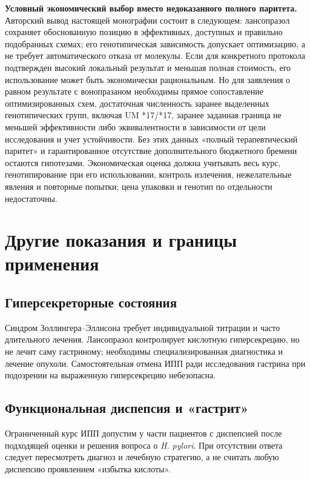 \documentclass[11pt,a4paper,notitlepage]{report}
\newcommand{\Hp}{\textit{H. pylori}}
\newcommand{\src}[1]{\unskip\space\cite{#1}}
\begin{document}
\textbf{Условный экономический выбор вместо недоказанного полного паритета.} Авторский вывод настоящей монографии состоит в следующем: лансопразол сохраняет обоснованную позицию в эффективных, доступных и правильно подобранных схемах; его генотипическая зависимость допускает оптимизацию, а не требует автоматического отказа от молекулы. Если для конкретного протокола подтвержден высокий локальный результат и меньшая полная стоимость, его использование может быть экономически рациональным. Но для заявления о равном результате с вонопразаном необходимы прямое сопоставление оптимизированных схем, достаточная численность заранее выделенных генотипических групп, включая UM *17/*17, заранее заданная граница не меньшей эффективности либо эквивалентности в зависимости от цели исследования и учет устойчивости. Без этих данных «полный терапевтический паритет» и гарантированное отсутствие дополнительного бюджетного бремени остаются гипотезами. Экономическая оценка должна учитывать весь курс, генотипирование при его использовании, контроль излечения, нежелательные явления и повторные попытки; цена упаковки и генотип по отдельности недостаточны.\src{acghp,maastricht,cpic,hptailored2007,hpphalcon2022,hpcost2021}

\section{Другие показания и границы применения}

\subsection{Гиперсекреторные состояния}
Синдром Золлингера--Эллисона требует индивидуальной титрации и часто длительного лечения. Лансопразол контролирует кислотную гиперсекрецию, но не лечит саму гастриному; необходимы специализированная диагностика и лечение опухоли. Самостоятельная отмена ИПП ради исследования гастрина при подозрении на выраженную гиперсекрецию небезопасна.\src{uslabel,emc}

\subsection{Функциональная диспепсия и «гастрит»}
\label{sec:dyspepsia}
Ограниченный курс ИПП допустим у части пациентов с диспепсией после подходящей оценки и решения вопроса о \Hp. При отсутствии ответа следует пересмотреть диагноз и лечебную стратегию, а не считать любую диспепсию проявлением «избытка кислоты».\src{nice}
\end{document}
